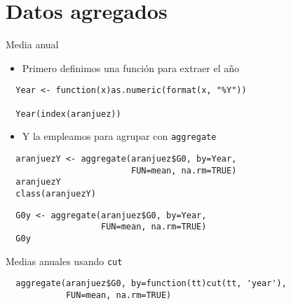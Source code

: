\documentclass[xcolor={usenames,svgnames,dvipsnames}]{beamer}
\begin{document}
\section{Datos agregados}
\label{sec-3}
\begin{frame}[fragile,label=sec-3-1]{Media anual}
 \begin{itemize}
\item Primero definimos una función para extraer el año
\end{itemize}
\lstset{language=R,label= ,caption= ,numbers=none}
\begin{lstlisting}
  Year <- function(x)as.numeric(format(x, "%Y"))
  
  Year(index(aranjuez))
\end{lstlisting}
\begin{itemize}
\item Y la empleamos para agrupar con \texttt{aggregate}
\end{itemize}
\lstset{language=R,label= ,caption= ,numbers=none}
\begin{lstlisting}
  aranjuezY <- aggregate(aranjuez$G0, by=Year,
                         FUN=mean, na.rm=TRUE)
  aranjuezY
  class(aranjuezY)
\end{lstlisting}

\lstset{language=R,label= ,caption= ,numbers=none}
\begin{lstlisting}
  G0y <- aggregate(aranjuez$G0, by=Year,
                   FUN=mean, na.rm=TRUE)
  G0y
\end{lstlisting}
\end{frame}

\begin{frame}[fragile,label=sec-3-2]{Medias anuales usando \texttt{cut}}
 \lstset{language=R,label= ,caption= ,numbers=none}
\begin{lstlisting}
  aggregate(aranjuez$G0, by=function(tt)cut(tt, 'year'),
            FUN=mean, na.rm=TRUE)
\end{lstlisting}
\end{frame}
\end{document}
